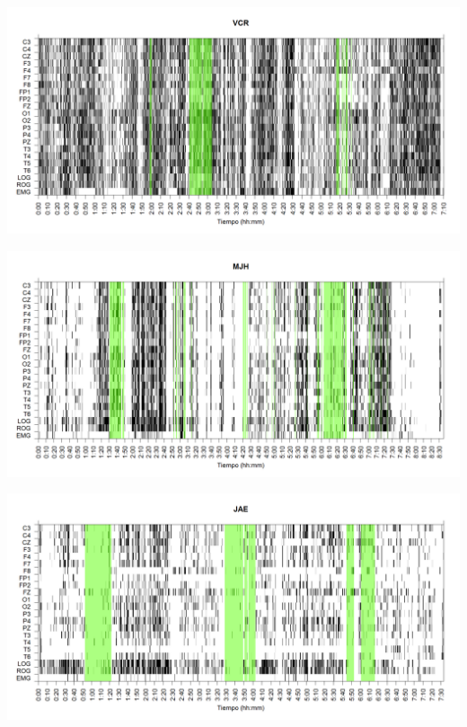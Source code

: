 
\begin{SidewaysFigure}
\centering
\includegraphics[width=\linewidth]
{./grafiquitos170404/VCNNS1_est.png} 
\caption{Sujeto: VCR | Total \'epocas: 2584 | \'Epocas MOR: 200
}
\label{VCR}
\end{SidewaysFigure}


\begin{SidewaysFigure}
\centering
\includegraphics[width=\linewidth]
{./grafiquitos170404/MJNNVIGILOS_est.png} 
\caption{Sujeto: MJH | Total \'epocas: 1032 | \'Epocas MOR: 127
}
\label{MJH}
\end{SidewaysFigure}


\begin{SidewaysFigure}
\centering
\includegraphics[width=\linewidth]
{./grafiquitos170404/JANASUE_est.png} 
\caption{Sujeto: JAE | Total \'epocas: 907 | \'Epocas MOR: 171
}
\label{JAE}
\end{SidewaysFigure}

